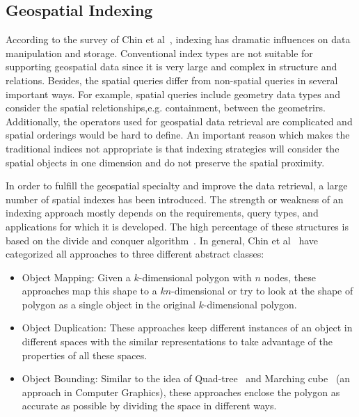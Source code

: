 \documentclass[a4paper,12pt]{article}
\begin{document}
\subsection{Geospatial Indexing}
\label{s.geospatial-index}
According to the survey of Chin et al~\cite{survey}, indexing has dramatic influences on data manipulation and storage. Conventional index types are not suitable for supporting geospatial data since it is very large and complex in structure and relations. Besides, the spatial queries differ from non-spatial queries in several important ways. For example, spatial queries include geometry data types and consider the spatial reletionships,e.g. containment, between the geometrirs. Additionally, the operators used for geospatial data retrieval are complicated and spatial orderings would be hard to define. An important reason which makes the traditional indices not appropriate is that indexing strategies will consider the spatial objects in one dimension and do not preserve the spatial proximity.

In order to fulfill the geospatial specialty and improve the data retrieval, a large number of spatial indexes has been introduced. The strength or weakness of an indexing approach mostly depends on the requirements, query types, and applications for which it is developed. 
The high percentage of these structures is based on the divide and conquer algorithm~\cite{divconquer}. 
In general, Chin et al~\cite{survey} have categorized all approaches to three different abstract classes:
\begin{itemize}
\item Object Mapping: Given a $k$-dimensional polygon with $n$ nodes, these approaches map this shape to a $kn$-dimensional or try to look at the shape of polygon as a single object in the original $k$-dimensional polygon.   
\item Object Duplication: These approaches keep different instances of an object in different spaces with the similar representations to take advantage of the properties of all these spaces. 
\item Object Bounding: Similar to the idea of Quad-tree~\cite{quadtree} and Marching cube~\cite{marchingcube} (an approach in Computer Graphics), 
these approaches enclose the polygon as accurate as possible by dividing the space in different ways. 
\end{itemize}
\end{document}
